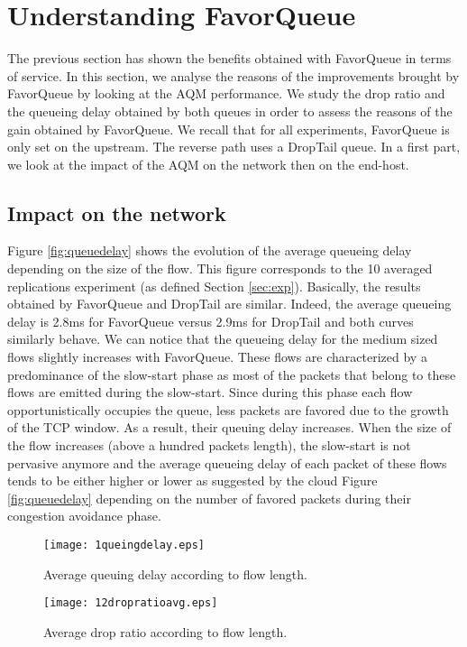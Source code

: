 \documentclass{elsart}
\begin{document}
\section{Understanding FavorQueue}
\label{sec:understand}

The previous section has shown the benefits obtained with FavorQueue in terms of service. 
In this section, we analyse the reasons of the improvements brought by FavorQueue by looking at the AQM performance. We study the drop ratio and the queueing delay obtained by both queues in order to assess the reasons of the gain obtained by FavorQueue. We recall that for all experiments, FavorQueue is only set on the upstream. The reverse path uses a DropTail queue. In a first part, we look at the impact of the AQM on the network then on the end-host.

\subsection{Impact on the network}
\label{subsec:medium}

Figure \ref{fig:queuedelay} shows the evolution of the average queueing delay depending on the size of the flow. This figure corresponds to the 10 averaged replications experiment (as defined Section \ref{sec:exp}).
Basically, the results obtained by FavorQueue and DropTail are similar. Indeed, the average queueing delay is 2.8ms for FavorQueue versus 2.9ms for DropTail and both curves similarly behave. 
We can notice that the queueing delay for the medium sized flows slightly increases with FavorQueue. These flows are characterized by a predominance of the slow-start phase as most of the packets that belong to these flows are emitted during the slow-start. Since during this phase each flow opportunistically occupies the queue, less packets are favored due to the growth of the TCP window. As a result, their queuing delay increases. When the size of the flow increases (above a hundred packets length), the slow-start is not pervasive anymore and the average queueing delay of each packet of these flows tends to be either higher or lower as suggested by the cloud Figure \ref{fig:queuedelay} depending on the number of favored packets during their congestion avoidance phase.

\begin{figure}[htb!]
   \begin{minipage}[b]{1.0\columnwidth}
	\centering
	\texttt{[image: 1queingdelay.eps]}
	\caption{Average queuing delay according to flow length.}
	\label{fig:queuedelay}
   \end{minipage}

   \begin{minipage}[b]{1.0\columnwidth}   
	\centering
	\texttt{[image: 12dropratioavg.eps]}
	\caption{Average drop ratio according to flow length.}
	\label{fig:dropavg}
   \end{minipage}
\end{figure}
\end{document}
